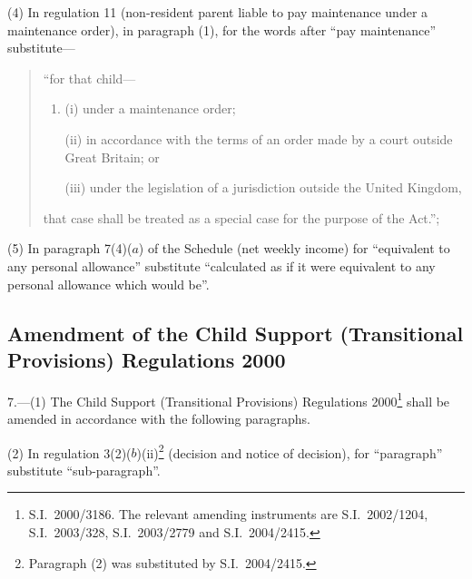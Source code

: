 \documentclass[12pt,a4paper]{article}
\begin{document}
(4) In regulation 11 (non-resident parent liable to pay maintenance under a maintenance order), in paragraph (1), for the words after “pay maintenance” substitute—
\begin{quotation}
    “for that child—
\begin{enumerate}\item[]
    (i) 
    under a maintenance order;

    (ii) 
    in accordance with the terms of an order made by a court outside Great Britain; or

    (iii)
    under the legislation of a jurisdiction outside the United Kingdom,
\end{enumerate}
    that case shall be treated as a special case for the purpose of the Act.”; 
\end{quotation}

(5) In paragraph 7(4)($a$)  of the Schedule (net weekly income) for “equivalent to any personal allowance” substitute “calculated as if it were equivalent to any personal allowance which would be”.

\subsection[7. Amendment of the Child Support (Transitional Provisions) Regulations 2000]{Amendment of the Child Support (Transitional Provisions) Regulations 2000}

7.---(1)  The Child Support (Transitional Provisions) Regulations 2000\footnote{S.I.\ 2000/3186. The relevant amending instruments are S.I.\ 2002/1204, S.I.\ 2003/328, S.I.\ 2003/2779 and S.I.\ 2004/2415.} shall be amended in accordance with the following paragraphs.

(2) In regulation 3(2)($b$)(ii)\footnote{Paragraph (2) was substituted by S.I.\ 2004/2415.} (decision and notice of decision), for “paragraph” substitute “sub-paragraph”.
\end{document}
